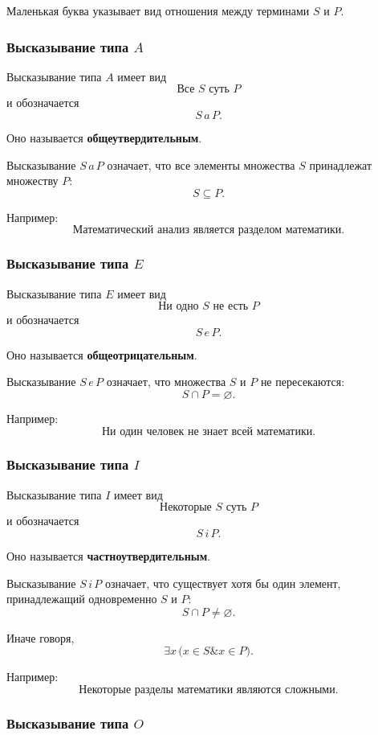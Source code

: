 \documentclass[12pt,a4paper,oneside,openany]{book}
\theoremstyle{definition}
\theoremstyle{plain}
\theoremstyle{remark}
\begin{document}
Маленькая буква указывает вид отношения между терминами \(S\) и
\(P\).

\subsubsection{Высказывание типа \(A\)}

Высказывание типа \(A\) имеет вид
\[
\text{Все }S\text{ суть }P
\]
и обозначается
\[
S\,a\,P.
\]

Оно называется \textbf{общеутвердительным}.

Высказывание \(S\,a\,P\) означает, что все элементы множества \(S\)
принадлежат множеству \(P\):
\[
S\subseteq P.
\]

Например:
\[
\text{Математический анализ является разделом математики}.
\]

\subsubsection{Высказывание типа \(E\)}

Высказывание типа \(E\) имеет вид
\[
\text{Ни одно }S\text{ не есть }P
\]
и обозначается
\[
S\,e\,P.
\]

Оно называется \textbf{общеотрицательным}.

Высказывание \(S\,e\,P\) означает, что множества \(S\) и \(P\) не
пересекаются:
\[
S\cap P=\varnothing.
\]

Например:
\[
\text{Ни один человек не знает всей математики}.
\]

\subsubsection{Высказывание типа \(I\)}

Высказывание типа \(I\) имеет вид
\[
\text{Некоторые }S\text{ суть }P
\]
и обозначается
\[
S\,i\,P.
\]

Оно называется \textbf{частноутвердительным}.

Высказывание \(S\,i\,P\) означает, что существует хотя бы один
элемент, принадлежащий одновременно \(S\) и \(P\):
\[
S\cap P\neq\varnothing.
\]

Иначе говоря,
\[
\exists x\,
\bigl(
x\in S
\mathbin{\&}
x\in P
\bigr).
\]

Например:
\[
\text{Некоторые разделы математики являются сложными}.
\]

\subsubsection{Высказывание типа \(O\)}
\end{document}
